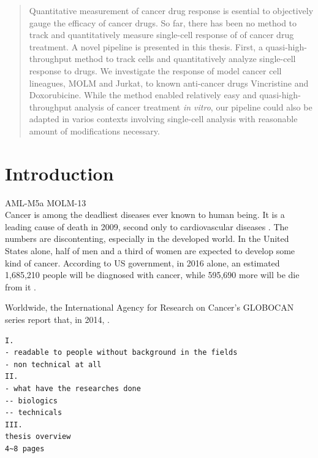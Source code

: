 \documentclass[pdftex,12pt,a4paper]{report}
\begin{document}

\begin{abstract}
Quantitative measurement of cancer drug response is esential to objectively gauge the efficacy of cancer drugs. So far, there has been no method to track and  quantitatively measure single-cell response of of cancer drug treatment. A novel pipeline is presented in this thesis. First, a quasi-high-throughput method to track cells and quantitatively analyze single-cell response to drugs. We investigate the response of model cancer cell lineagues, MOLM and Jurkat, to known anti-cancer drugs Vincristine and Doxorubicine. While the method enabled relatively easy and quasi-high-throughput analysis of cancer treatment \textit{in vitro}, our pipeline could also be adapted in varios contexts involving single-cell analysis with reasonable amount of modifications necessary.
\end{abstract}

\newpage

\tableofcontents

\newpage

\listoffigures

\newpage

\listoftables

\newpage

\chapter{Introduction}
\label{chapter:introduction}

AML-M5a MOLM-13\\

Cancer is among the deadliest diseases ever known to human being. It is a leading cause of death in 2009, second only to cardiovascular diseases \cite{sudhakar2009history}. The numbers are discontenting, especially in the developed world. In the United States alone, half of men and a third of women are expected to develop some kind of cancer. According to US government, in 2016 alone, an estimated 1,685,210 people will be diagnosed with cancer, while 595,690 more will be die from it \cite{cancergov2017stat}.

Worldwide, the International Agency for Research on Cancer's GLOBOCAN series report that, in 2014, \cite{ferlay2015cancer}.

\begin{verbatim}
I.
- readable to people without background in the fields
- non technical at all
II.
- what have the researches done
-- biologics
-- technicals
III.
thesis overview
4~8 pages
\end{verbatim}
\end{document}
